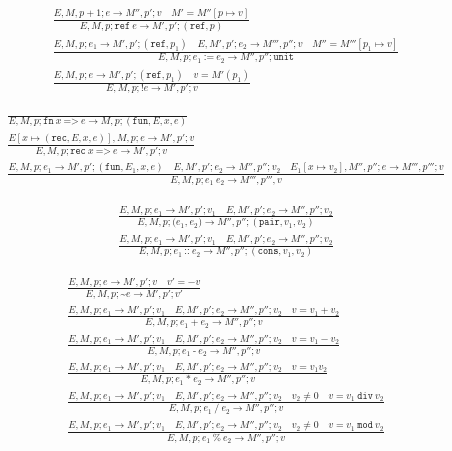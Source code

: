 \documentclass{article}
\begin{document}
\begin{align*}
\tag{\sc E-Ref}
\frac{E,M,p+1;e\rightarrow M'',p';v \quad M'=M''[p\mapsto v]}
{E,M,p;\texttt{ref}\ e\rightarrow M',p';(\texttt{ref},p)}
\\
\tag{\sc E-Assign}
\frac{E,M,p;e_1\rightarrow M',p';(\texttt{ref},p_1) \quad E,M',p';e_2\rightarrow M''',p'';v \quad M''=M'''[p_1\mapsto v]}
{E,M,p;e_1\ \texttt{:=}\ e_2\rightarrow M'',p'';\texttt{unit}}
\\
\tag{\sc E-Deref}
\frac{E,M,p;e\rightarrow M',p';(\texttt{ref},p_1) \quad v=M'(p_1)}
{E,M,p;\texttt{!}e\rightarrow M',p';v}
\end{align*}

\begin{align*}
\tag{\sc E-Fn}
\frac{}
{E,M,p;\texttt{fn}\ x\ \texttt{=>}\ e\rightarrow M,p;(\texttt{fun},E,x,e)}
\\
\tag{\sc E-Rec}
\frac{E[x\mapsto(\texttt{rec},E,x,e)],M,p;e\rightarrow M',p';v}
{E,M,p;\texttt{rec}\ x\ \texttt{=>}\ e\rightarrow M',p';v}
\\
\tag{\sc E-App}
\frac{E,M,p;e_1\rightarrow M',p';(\texttt{fun},E_1,x,e) \quad E,M',p';e_2\rightarrow M'',p'';v_2 \quad E_1[x\mapsto v_2],M'',p'';e\rightarrow M''',p''';v}
{E,M,p;e_1\ e_2\rightarrow M''',p''',v}
\end{align*}

\begin{align*}
\tag{\sc E-Pair}
\frac{E,M,p;e_1\rightarrow M',p';v_1 \quad E,M',p';e_2\rightarrow M'',p'';v_2}
{E,M,p;\texttt{(}e_1\texttt{,}\ e_2\texttt{)}\rightarrow M'',p'';(\texttt{pair},v_1,v_2)}
\\
\tag{\sc E-Cons}
\frac{E,M,p;e_1\rightarrow M',p';v_1 \quad E,M',p';e_2\rightarrow M'',p'';v_2}
{E,M,p;e_1\ \texttt{::}\ e_2\rightarrow M'',p'';(\texttt{cons},v_1,v_2)}
\end{align*}

\begin{align*}
\tag{\sc E-Neg}
\frac{E,M,p;e\rightarrow M',p';v \quad v'=-v}
{E,M,p;\texttt{\textasciitilde}e\rightarrow M',p';v'}
\\
\tag{\sc E-Add}
\frac{E,M,p;e_1\rightarrow M',p';v_1 \quad E,M',p';e_2\rightarrow M'',p'';v_2 \quad v=v_1+v_2}
{E,M,p;e_1\ \texttt{+}\ e_2\rightarrow M'',p'';v}
\\
\tag{\sc E-Sub}
\frac{E,M,p;e_1\rightarrow M',p';v_1 \quad E,M',p';e_2\rightarrow M'',p'';v_2 \quad v=v_1-v_2}
{E,M,p;e_1\ \texttt{-}\ e_2\rightarrow M'',p'';v}
\\
\tag{\sc E-Mul}
\frac{E,M,p;e_1\rightarrow M',p';v_1 \quad E,M',p';e_2\rightarrow M'',p'';v_2 \quad v=v_1 v_2}
{E,M,p;e_1\ \texttt{*}\ e_2\rightarrow M'',p'';v}
\\
\tag{\sc E-Div}
\frac{E,M,p;e_1\rightarrow M',p';v_1 \quad E,M',p';e_2\rightarrow M'',p'';v_2 \quad v_2\ne 0 \quad v=v_1\ \mathtt{div}\ v_2}
{E,M,p;e_1\ \texttt{/}\ e_2\rightarrow M'',p'';v}
\\
\tag{\sc E-Mod}
\frac{E,M,p;e_1\rightarrow M',p';v_1 \quad E,M',p';e_2\rightarrow M'',p'';v_2 \quad v_2\ne 0 \quad v=v_1\ \mathtt{mod}\ v_2}
{E,M,p;e_1\ \texttt{\%}\ e_2\rightarrow M'',p'';v}
\end{align*}
\end{document}
